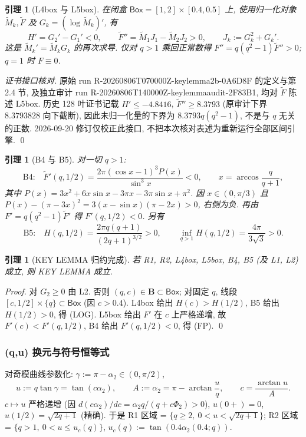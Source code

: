 \documentclass[UTF8]{ctexart}
\newtheorem{lemma}[theorem]{引理}
\begin{document}
\begin{lemma}[L4box 与 L5box]\label{lem:box}
在闭盒 $\mathsf{Box}=[1,2]\times[0.4,0.5]$ 上, 使用归一化对象
$\widetilde M_k,\widetilde F$ 及 $G_k=(\log\widetilde M_k)'$, 有
\begin{equation}
 H'=G_2'-G_1'<0,\qquad
 \widetilde F''=\widetilde M_1J_1-\widetilde M_2J_2>0,\qquad
 J_k:=G_k^2+G_k'.
\end{equation}
这是 $\widetilde M_k'=\widetilde M_kG_k$ 的再次求导.
仅对 $q>1$ 乘回正常数得
$F''=q(q^2-1)\widetilde F''>0$; $q=1$ 时 $F\equiv0$.
\end{lemma}
\begin{proof}[证书接口核对]
原始 run R-20260806T070000Z-keylemma2b-0A6D8F 的定义与第 2.4 节,
及独立审计 run R-20260806T140000Z-keylemmaaudit-2F83B1,
均对 $\widetilde F$ 陈述 L5box. 历史 128 叶证书记载
$H'\le-4.8416$, $\widetilde F''\ge8.3793$ (原审计下界 $8.3793828$ 向下截断),
因此未归一化量的下界为 $8.3793q(q^2-1)$, 不是与 $q$ 无关的正数.
2026-09-20 修订仅校正此接口, 不把本次核对表述为重新运行全部区间引擎. \qed
\end{proof}

\begin{lemma}[B4 与 B5]
\label{lem:b45}
对一切 $q>1$:
\begin{equation}
	\text{B4:}\quad \widetilde F'(q,1/2)=\frac{2\pi(\cos x-1)^3P(x)}{\sin^3x}<0,\qquad
	x=\arccos\frac q{q+1},
\end{equation}
其中 $P(x)=3x^2+6x\sin x-3\pi x-3\pi\sin x+\pi^2$.
因 $x\in(0,\pi/3)$ 且 $P(x)-(\pi-3x)^2=3(x-\sin x)(\pi-2x)>0$,
右侧为负. 再由 $F'=q(q^2-1)\widetilde F'$ 得 $F'(q,1/2)<0$.
另有
\begin{equation}
	\text{B5:}\quad H(q,1/2)=\frac{2\pi q(q+1)}{(2q+1)^{3/2}}>0,\qquad
	\inf_{q>1}H(q,1/2)=\frac{4\pi}{3\sqrt3}>0.
\end{equation}
\end{lemma}

\begin{lemma}[KEY LEMMA 归约完成]
若 R1, R2, L4box, L5box, B4, B5 (及 L1, L2) 成立, 则 KEY LEMMA 成立.
\end{lemma}
\begin{proof}
对 $G_2\ge0$ 由 L2. 否则 $(q,c)\in\mathbf B\subset\mathsf{Box}$; 对固定 $q$,
线段 $[c,1/2]\times\{q\}\subset\mathsf{Box}$ (因 $c>0.4$). L4box 给出
$H(c)>H(1/2)$, B5 给出 $H(1/2)>0$, 得 (LOG). L5box 给出 $F'$ 在 $c$ 上严格递增,
故 $F'(c)<F'(q,1/2)$, B4 给出 $F'(q,1/2)<0$, 得 (FP). \qed
\end{proof}

\subsubsection{(q,u) 换元与符号恒等式}
对奇模曲线参数化: $\gamma:=\pi-\alpha_2\in(0,\pi/2)$,
\begin{equation}
	u:=q\tan\gamma=\tan(c\alpha_2),\qquad A:=\alpha_2=\pi-\arctan\frac uq,\qquad
	c=\frac{\arctan u}{A}.
\end{equation}
$c\mapsto u$ 严格递增 (因 $d(c\alpha_2)/dc=\alpha_2q/(q+c\Phi_2)>0$), $u(0+)=0$,
$u(1/2)=\sqrt{2q+1}$ (精确). 于是 R1 区域 = $\{q\ge2,\ 0<u<\sqrt{2q+1}\}$;
R2 区域 = $\{q>1,\ 0<u\le u_c(q)\}$, $u_c(q):=\tan(0.4\alpha_2(0.4;q))$.
\end{document}
